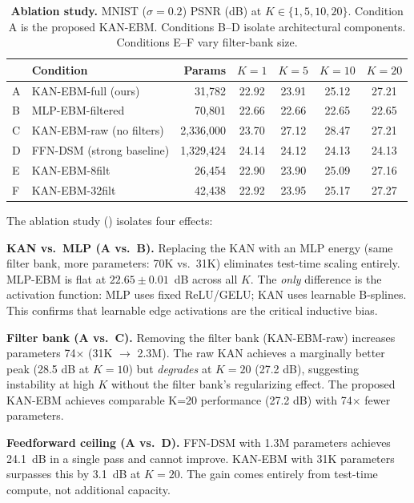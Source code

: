 \documentclass{article}
\begin{document}
\begin{table}[ht]
\centering
\caption{%
  \textbf{Ablation study.} MNIST ($\sigma{=}0.2$) PSNR (dB) at $K \in \{1,5,10,20\}$.
  Condition A is the proposed KAN-EBM. Conditions B--D isolate architectural components.
  Conditions E--F vary filter-bank size.
}
\label{tab:ablation}
\begin{tabular}{llrcccc}
\toprule
& Condition & Params & $K{=}1$ & $K{=}5$ & $K{=}10$ & $K{=}20$ \\
\midrule
A & KAN-EBM-full (ours)      &  31,782 & 22.92 & 23.91 & 25.12 & 27.21 \\
B & MLP-EBM-filtered         &  70,801 & 22.66 & 22.66 & 22.65 & 22.65 \\
C & KAN-EBM-raw (no filters) & 2,336,000 & 23.70 & 27.12 & 28.47 & 27.21 \\
D & FFN-DSM (strong baseline)& 1,329,424 & 24.14 & 24.12 & 24.13 & 24.13 \\
E & KAN-EBM-8filt            &  26,454 & 22.90 & 23.90 & 25.09 & 27.16 \\
F & KAN-EBM-32filt           &  42,438 & 22.92 & 23.95 & 25.17 & 27.27 \\
\bottomrule
\end{tabular}
\end{table}

The ablation study () isolates four effects:

\textbf{KAN vs.\ MLP (A vs.\ B).} Replacing the KAN with an MLP energy (same filter
bank, more parameters: 70K vs.\ 31K) eliminates test-time scaling entirely.
MLP-EBM is flat at $22.65\pm0.01$~dB across all $K$. The \emph{only} difference
is the activation function: MLP uses fixed ReLU/GELU; KAN uses learnable B-splines.
This confirms that learnable edge activations are the critical inductive bias.

\textbf{Filter bank (A vs.\ C).} Removing the filter bank (KAN-EBM-raw) increases
parameters 74$\times$ (31K $\to$ 2.3M). The raw KAN achieves a marginally better peak
(28.5 dB at $K{=}10$) but \emph{degrades} at $K{=}20$ (27.2 dB), suggesting instability
at high $K$ without the filter bank's regularizing effect. The proposed KAN-EBM
achieves comparable K=20 performance (27.2 dB) with 74$\times$ fewer parameters.

\textbf{Feedforward ceiling (A vs.\ D).} FFN-DSM with 1.3M parameters achieves
24.1~dB in a single pass and cannot improve. KAN-EBM with 31K parameters surpasses
this by 3.1~dB at $K{=}20$. The gain comes entirely from test-time compute, not
additional capacity.
\end{document}
